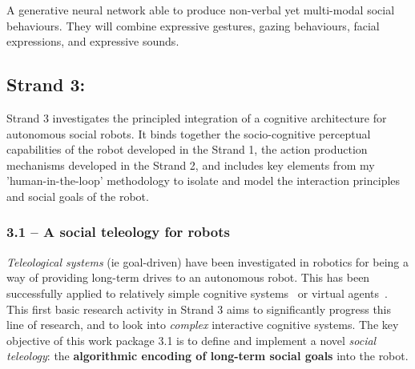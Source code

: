 \begin{outcome}{2.2}
A generative neural network
    able to produce non-verbal yet multi-modal social behaviours. They will
    combine expressive gestures, gazing behaviours, facial expressions, and
    expressive sounds.
\end{outcome}


\subsection{Strand 3: \textbf{\wpFour}}

Strand 3 investigates the principled integration of a cognitive
architecture for autonomous social robots. It binds together the socio-cognitive
perceptual capabilities of the robot developed in the Strand 1, the action
production mechanisms developed in the Strand 2, and includes key elements from
my 'human-in-the-loop' methodology to isolate and model the interaction principles
and social goals of the robot.

\subsubsection{3.1 -- A social teleology for robots}

\emph{Teleological systems} (ie goal-driven) have been investigated in robotics
for being a way of providing long-term drives to an autonomous robot. This has
been successfully applied to relatively simple cognitive
systems~\parencite{oudeyer2005playground,moulinfrier2014self} or virtual
agents~\parencite{pathak2017curiosity}. This first basic research activity in
Strand 3 aims to significantly progress this line of research, and to look into
\emph{complex} interactive cognitive systems. The key objective of this work
package 3.1 is to define and implement a novel \emph{social teleology}: the
\textbf{algorithmic encoding of long-term social goals} into the robot.

